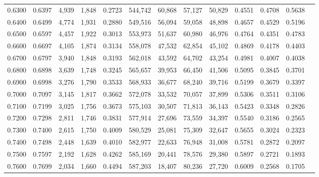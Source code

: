\begin{tabular}{rrrrrrrrrrrrr}
0.6300 & 0.6397 &  4,939 & 1,848 &                                     0.2723 & 544,742 &  60,868 &  57,127 &  50,829 & 0.4551 & 0.4708 & 0.5638 \\
0.6400 & 0.6499 &  4,774 & 1,931 &                                     0.2880 & 549,516 &  56,094 &  59,058 &  48,898 & 0.4657 & 0.4529 & 0.5196 \\
0.6500 & 0.6597 &  4,457 & 1,922 &                                     0.3013 & 553,973 &  51,637 &  60,980 &  46,976 & 0.4764 & 0.4351 & 0.4783 \\
0.6600 & 0.6697 &  4,105 & 1,874 &                                     0.3134 & 558,078 &  47,532 &  62,854 &  45,102 & 0.4869 & 0.4178 & 0.4403 \\
0.6700 & 0.6797 &  3,940 & 1,848 &                                     0.3193 & 562,018 &  43,592 &  64,702 &  43,254 & 0.4981 & 0.4007 & 0.4038 \\
0.6800 & 0.6898 &  3,639 & 1,748 &                                     0.3245 & 565,657 &  39,953 &  66,450 &  41,506 & 0.5095 & 0.3845 & 0.3701 \\
0.6900 & 0.6998 &  3,276 & 1,790 &                                     0.3533 & 568,933 &  36,677 &  68,240 &  39,716 & 0.5199 & 0.3679 & 0.3397 \\
0.7000 & 0.7097 &  3,145 & 1,817 &                                     0.3662 & 572,078 &  33,532 &  70,057 &  37,899 & 0.5306 & 0.3511 & 0.3106 \\
0.7100 & 0.7199 &  3,025 & 1,756 &                                     0.3673 & 575,103 &  30,507 &  71,813 &  36,143 & 0.5423 & 0.3348 & 0.2826 \\
0.7200 & 0.7298 &  2,811 & 1,746 &                                     0.3831 & 577,914 &  27,696 &  73,559 &  34,397 & 0.5540 & 0.3186 & 0.2565 \\
0.7300 & 0.7400 &  2,615 & 1,750 &                                     0.4009 & 580,529 &  25,081 &  75,309 &  32,647 & 0.5655 & 0.3024 & 0.2323 \\
0.7400 & 0.7498 &  2,448 & 1,639 &                                     0.4010 & 582,977 &  22,633 &  76,948 &  31,008 & 0.5781 & 0.2872 & 0.2097 \\
0.7500 & 0.7597 &  2,192 & 1,628 &                                     0.4262 & 585,169 &  20,441 &  78,576 &  29,380 & 0.5897 & 0.2721 & 0.1893 \\
0.7600 & 0.7699 &  2,034 & 1,660 &                                     0.4494 & 587,203 &  18,407 &  80,236 &  27,720 & 0.6009 & 0.2568 & 0.1705 \\

\end{tabular}
